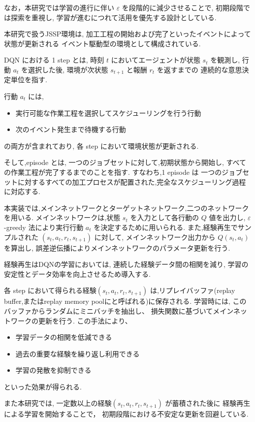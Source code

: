 \documentclass{jarticle}
\begin{document}
なお，本研究では学習の進行に伴い
$\varepsilon$ を段階的に減少させることで,
初期段階では探索を重視し,
学習が進むにつれて活用を優先する設計としている.

本研究で扱うJSSP環境は,
加工工程の開始および完了といったイベントによって状態が更新される
イベント駆動型の環境として構成されている.

DQN における 1 step とは,
時刻 $t$ においてエージェントが状態 $s_t$ を観測し,
行動 $a_t$ を選択した後,
環境が次状態 $s_{t+1}$ と報酬 $r_t$ を返すまでの
連続的な意思決定単位を指す.

行動 $a_t$ には,
\begin{itemize}
\item 実行可能な作業工程を選択してスケジューリングを行う行動
\item 次のイベント発生まで待機する行動
\end{itemize}
の両方が含まれており,
各 step において環境状態が更新される.

そして,episode とは,
一つのジョブセットに対して,初期状態から開始し,
すべての作業工程が完了するまでのことを指す.
すなわち,1 episode は
一つのジョブセットに対するすべての加工プロセスが配置された,完全なスケジューリング過程に対応する.

本実装では,メインネットワークとターゲットネットワーク,二つのネットワークを用いる.
メインネットワークは,状態 $s_t$ を入力として各行動の $Q$ 値を出力し,
$\varepsilon$-greedy 法により実行行動 $a_t$ を決定するために用いられる.
また,経験再生でサンプルされた $(s_t,a_t,r_t,s_{t+1})$ に対して,
メインネットワーク出力から $Q(s_t,a_t)$ を算出し,
誤差逆伝播によりメインネットワークのパラメータ更新を行う.

経験再生はDQNの学習においては,
連続した経験データ間の相関を減り,
学習の安定性とデータ効率を向上させるため導入する.

各 step において得られる経験$(s_t,a_t,r_t,s_{t+1})$ 
は,リプレイバッファ(replay buffer,またはreplay memory poolにと呼ばれる)に保存される.
学習時には,
このバッファからランダムにミニバッチを抽出し、
損失関数に基づいてメインネットワークの更新を行う.
この手法により、
\begin{itemize}
\item 学習データの相関を低減できる
\item 過去の重要な経験を繰り返し利用できる
\item 学習の発散を抑制できる
\end{itemize}
といった効果が得られる.

また本研究では,
一定数以上の経験$(s_t,a_t,r_t,s_{t+1})$ が蓄積された後に
経験再生による学習を開始することで，
初期段階における不安定な更新を回避している.
\end{document}
